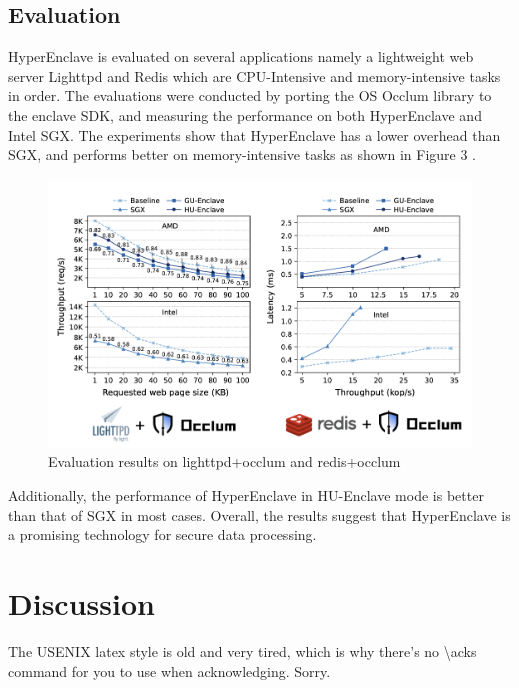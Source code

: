 \subsection{Evaluation}
HyperEnclave is evaluated on several applications namely a lightweight web server Lighttpd and Redis  which are CPU-Intensive and memory-intensive tasks in order. The evaluations were conducted by porting the OS Occlum library to the enclave SDK, and measuring the performance on both HyperEnclave and Intel SGX. The experiments show that HyperEnclave has a lower overhead than SGX, and performs better on memory-intensive tasks as shown in Figure 3 .

\begin{figure}[H]
    \centerline{\includegraphics[scale=.30]{figures/evaluation.png}}
    \caption{Evaluation results on lighttpd+occlum and redis+occlum}
    \label{fig}
\end{figure}

 Additionally, the performance of HyperEnclave in HU-Enclave mode is better than that of SGX in most cases. Overall, the results suggest that HyperEnclave is a promising technology for secure data processing.



\section{Discussion}

The USENIX latex style is old and very tired, which is why
there's no \textbackslash{}acks command for you to use when
acknowledging. Sorry.

